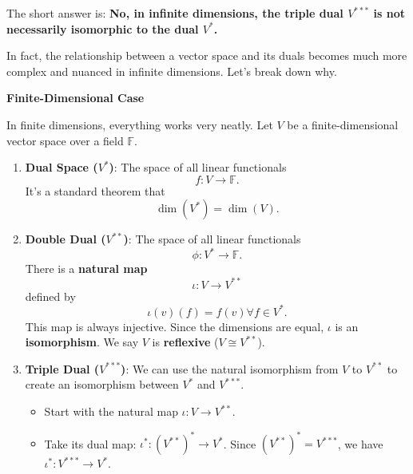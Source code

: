 \documentclass[aps,preprint]{revtex4}
\newenvironment{answer}
  {\begin{tcolorbox}[colback=green!5!white,colframe=green!75!black,title=Answer]}
  {\end{tcolorbox}}
\begin{document}
\begin{answer}
The short answer is: \textbf{No, in infinite dimensions, the triple dual $%
V^{\ast \ast \ast }$ is not necessarily isomorphic to the dual $V^{\ast }$.}

In fact, the relationship between a vector space and its duals becomes much
more complex and nuanced in infinite dimensions. Let's break down why.

\textbf{Finite-Dimensional Case}

In finite dimensions, everything works very neatly. Let $V$ be a
finite-dimensional vector space over a field $\mathbb{F}$.

\begin{enumerate}
\item \textbf{Dual Space ($V^{\ast }$)}: The space of all linear functionals%
\begin{equation}
f:V\rightarrow \mathbb{F}.
\end{equation}
It's a standard theorem that 
\begin{equation}
\dim (V^{\ast })=\dim (V).
\end{equation}

\item \textbf{Double Dual ($V^{\ast \ast }$)}: The space of all linear
functionals 
\begin{equation}
\phi :V^{\ast }\rightarrow \mathbb{F}.
\end{equation}
There is a \textbf{natural map}%
\begin{equation}
\iota :V\rightarrow V^{\ast \ast }
\end{equation}
defined by 
\begin{equation}
\iota (v)(f)=f(v)\forall f\in V^{\ast }.
\end{equation}%
This map is always injective. Since the dimensions are equal, $\iota $ is an 
\textbf{isomorphism}. We say $V$ is \textbf{reflexive} ($V\cong V^{\ast \ast
}$).

\item \textbf{Triple Dual ($V^{***}$)}: We can use the natural isomorphism
from $V$ to $V^{**}$ to create an isomorphism between $V^*$ and $V^{***}$.

\begin{itemize}
\item Start with the natural map $\iota: V \to V^{**}$.

\item Take its dual map: $\iota^*: (V^{**})^* \to V^*$. Since $(V^{**})^* =
V^{***}$, we have $\iota^*: V^{***} \to V^*$.


\end{itemize}
\end{enumerate}
\end{answer}
\end{document}
